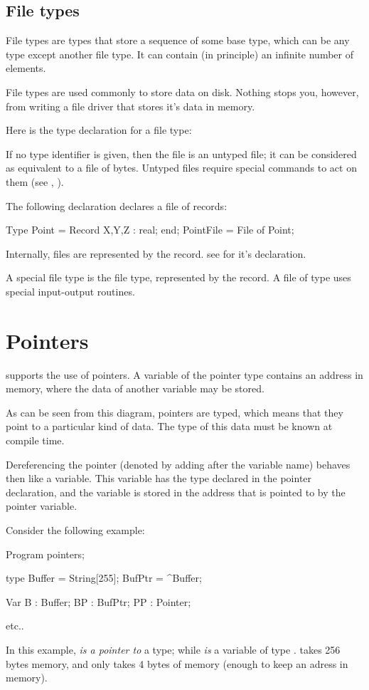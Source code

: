 \documentclass{report}
\begin{document}
\subsection{File types}

File types are types that store a sequence of some base type, which can be
any type except another file type. It can contain (in principle) an infinite
number of elements.

File types are used commonly to store data on disk. Nothing stops you,
however, from writing a file driver that stores it's data in memory.

Here is the type declaration for a file type:

If no type identifier is given, then the file is an untyped file; it can be
considered as equivalent to a file of bytes. Untyped files require special
commands to act on them (see , ).

The following declaration declares a file of records:
\begin{listing}
Type
   Point = Record
     X,Y,Z : real;
     end;
   PointFile = File of Point;
\end{listing}

Internally, files are represented by the  record.
see  for it's declaration.
 
A special file type is the  file type, represented by the
 record. A file of type  uses special input-output
routines.

\section{Pointers}
\fpc supports the use of pointers. A variable of the pointer type
contains an address in memory, where the data of another variable may be 
stored.



As can be seen from this diagram, pointers are typed, which means that 
they point to a particular kind of data. The type of this data must be 
known at compile time.

Dereferencing the pointer (denoted by adding \var{\^{}} after the variable
name) behaves then like a variable. This variable has the type declared in
the pointer declaration, and the variable is stored in the address that is 
pointed to by the pointer variable.

Consider the following example:
\begin{listing}
Program pointers;

type 
  Buffer = String[255];
  BufPtr = ^Buffer;

Var B  : Buffer;
    BP : BufPtr;
    PP : Pointer;

etc..
\end{listing}
In this example,  {\em is a pointer to} a  type; while 
{\em is} a variable of type .  takes 256 bytes memory,
and  only takes 4 bytes of memory (enough to keep an adress in
memory).
\end{document}
